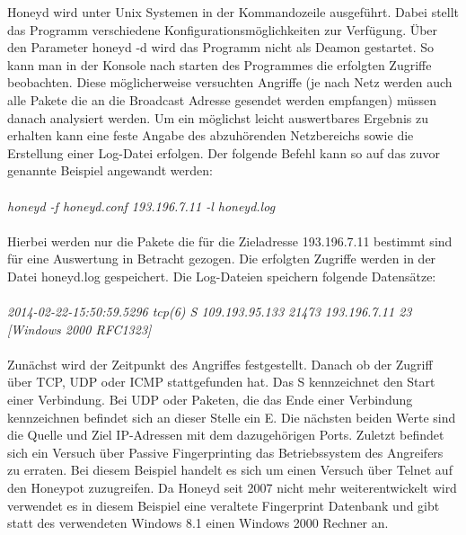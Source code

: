 Honeyd wird unter Unix Systemen in der Kommandozeile ausgeführt. Dabei stellt das Programm verschiedene Konfigurationsmöglichkeiten zur Verfügung. Über den Parameter honeyd -d wird das Programm nicht als Deamon gestartet. So kann man in der Konsole nach starten des Programmes die erfolgten Zugriffe beobachten. Diese möglicherweise versuchten Angriffe (je nach Netz werden auch alle Pakete die an die Broadcast Adresse gesendet werden empfangen) müssen danach analysiert werden. Um ein möglichst leicht auswertbares Ergebnis zu erhalten kann eine feste Angabe des abzuhörenden Netzbereichs sowie die Erstellung einer Log-Datei erfolgen. Der folgende Befehl kann so auf das zuvor genannte Beispiel angewandt werden:\\
\\
\noindent\emph{honeyd -f honeyd.conf 193.196.7.11 -l honeyd.log}\\
\\
Hierbei werden nur die Pakete die für die Zieladresse 193.196.7.11 bestimmt sind für eine Auswertung in Betracht gezogen. Die erfolgten Zugriffe werden in der Datei honeyd.log gespeichert.
Die Log-Dateien speichern folgende Datensätze: \\
\\
\noindent\emph{2014-02-22-15:50:59.5296 tcp(6) S 109.193.95.133 21473 193.196.7.11 23 [Windows 2000 RFC1323]}\\
\\
Zunächst wird der Zeitpunkt des Angriffes festgestellt. Danach ob der Zugriff über TCP, UDP oder ICMP stattgefunden hat. Das S kennzeichnet den Start einer Verbindung. Bei UDP oder Paketen, die das Ende einer Verbindung kennzeichnen befindet sich an dieser Stelle ein E. Die nächsten beiden Werte sind die Quelle und Ziel IP-Adressen mit dem dazugehörigen Ports. Zuletzt befindet sich ein Versuch über Passive Fingerprinting das Betriebssystem des Angreifers zu erraten. 
Bei diesem Beispiel handelt es sich um einen Versuch über Telnet auf den Honeypot zuzugreifen. Da Honeyd seit 2007 nicht mehr weiterentwickelt wird verwendet es in diesem Beispiel eine veraltete Fingerprint Datenbank und gibt statt des verwendeten Windows 8.1 einen Windows 2000 Rechner an. 